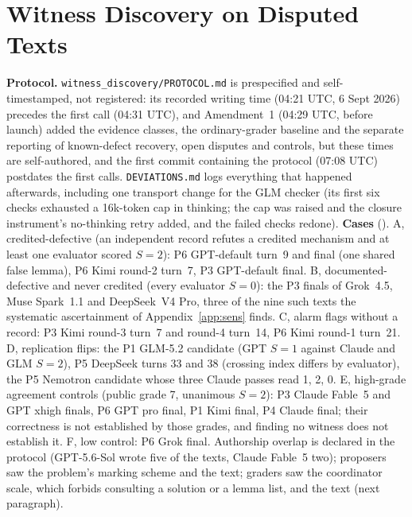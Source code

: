 \section{Witness Discovery on Disputed Texts}
\label{app:witness}
\textbf{Protocol.} \texttt{witness\_discovery/\allowbreak PROTOCOL.md} is prespecified and self-timestamped, not registered: its recorded writing time (04:21 UTC, 6 Sept 2026) precedes the first call (04:31 UTC), and Amendment~1 (04:29 UTC, before launch) added the evidence classes, the ordinary-grader baseline and the separate reporting of known-defect recovery, open disputes and controls, but these times are self-authored, and the first commit containing the protocol (07:08 UTC) postdates the first calls. \texttt{DEVIATIONS.md} logs everything that happened afterwards, including one transport change for the GLM checker (its first six checks exhausted a 16k-token cap in thinking; the cap was raised and the closure instrument's no-thinking retry added, and the failed checks redone). \textbf{Cases} (\WITNESSN). A, credited-defective (an independent record refutes a credited mechanism and at least one evaluator scored $S{=}2$): P6 GPT-default turn~9 and final (one shared false lemma), P6 Kimi round-2 turn~7, P3 GPT-default final. B, documented-defective and never credited (every evaluator $S{=}0$): the P3 finals of Grok~4.5, Muse Spark~1.1 and DeepSeek~V4 Pro, three of the nine such texts the systematic ascertainment of Appendix~\ref{app:sens} finds. C, alarm flags without a record: P3 Kimi round-3 turn~7 and round-4 turn~14, P6 Kimi round-1 turn~21. D, replication flips: the P1 GLM-5.2 candidate (GPT $S{=}1$ against Claude and GLM $S{=}2$), P5 DeepSeek turns 33 and 38 (crossing index differs by evaluator), the P5 Nemotron candidate whose three Claude passes read 1, 2, 0. E, high-grade agreement controls (public grade 7, unanimous $S{=}2$): P3 Claude Fable~5 and GPT xhigh finals, P6 GPT pro final, P1 Kimi final, P4 Claude final; their correctness is not established by those grades, and finding no witness does not establish it. F, low control: P6 Grok final. Authorship overlap is declared in the protocol (GPT-5.6-Sol wrote five of the texts, Claude Fable~5 two); proposers saw the problem's marking scheme and the text; graders saw the coordinator scale, which forbids consulting a solution or a lemma list, and the text (next paragraph).

